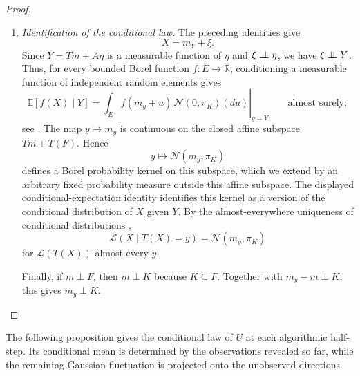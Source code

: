 \begin{proof}
\begin{enumerate}[wide]
            \item \emph{Identification of the conditional law.}
            The preceding identities give
            \[
                X=m_Y+\xi.
            \]
            Since $Y=Tm+A\eta$ is a measurable function of $\eta$
            and $\xi\perp \!\!\! \perp\eta$, we have
            \(
                \xi\perp \!\!\! \perp Y
            \).
            Thus, for every bounded Borel function
            $f:E\to\mathbb R$, conditioning a measurable function
            of independent random elements gives
            \[
                \mathbb E[f(X)\mid Y]
                =
                \left.
                \int_E f(m_y+u)\,
                    \mathcal N(0,\pi_K)(du)
                \right|_{y=Y}
                \qquad\text{almost surely};
            \]
            see \cite[Lemma~8.7(i)]{kallenberg2021foundations}.
            The map $y\mapsto m_y$ is continuous on the closed affine
            subspace $Tm+T(F)$. Hence
            \[
                y\longmapsto\mathcal N(m_y,\pi_K)
            \]
            defines a Borel probability kernel on this subspace,
            which we extend by an arbitrary fixed probability measure outside
            this affine subspace.
            The displayed conditional-expectation identity identifies
            this kernel as a version of the conditional distribution
            of $X$ given $Y$. By the almost-everywhere uniqueness of
            conditional distributions
            \cite[Theorem~8.5]{kallenberg2021foundations},
            \[
                \mathscr L(X\mid T(X)=y)
                =
                \mathcal N(m_y,\pi_K)
            \]
            for $\mathscr L(T(X))$-almost every $y$.
        
            Finally, if $m\perp F$, then $m\perp K$ because
            $K\subseteq F$. Together with $m_y-m\perp K$, this gives
            $m_y\perp K$.
        \end{enumerate}
        \end{proof}

        The following proposition gives the conditional law of $U$
        at each algorithmic half-step. Its conditional mean is
        determined by the observations revealed so far, while the
        remaining Gaussian fluctuation is projected onto the
        unobserved directions.

